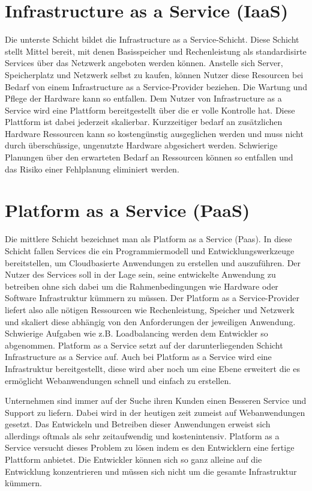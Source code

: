 \section{Infrastructure as a Service (IaaS)}
\label{sec:iaas}
Die unterste Schicht bildet die Infrastructure as a Service-Schicht.
\glqq Diese Schicht stellt Mittel bereit, mit denen Basisspeicher und Rechenleistung als standardisirte Services über das Netzwerk angeboten werden können.\grqq \cite[S. 30]{meinel_virtualisierung_2011}
Anstelle sich Server, Speicherplatz und Netzwerk selbst zu kaufen, können Nutzer diese Resourcen
bei Bedarf von einem Infrastructure as a Service-Provider beziehen. Die Wartung und Pflege der Hardware kann so entfallen.
Dem Nutzer von Infrastructure as a Service wird eine Plattform bereitgestellt über die er volle Kontrolle hat. Diese Plattform ist dabei jederzeit skalierbar. Kurzzeitiger bedarf an zusätzlichen Hardware Ressourcen kann so kostengünstig ausgeglichen werden und muss nicht durch überschüssige, ungenutzte Hardware abgesichert werden.
Schwierige Planungen über den erwarteten Bedarf an Ressourcen können so entfallen und das Risiko einer Fehlplanung eliminiert werden.

\section{Platform as a Service (PaaS)}
\label{sec:paas}
Die mittlere Schicht bezeichnet man als Platform as a Service (Paas). In diese Schicht fallen Services die ein \glqq Programmiermodell und Entwicklungswerkzeuge bereitstellen, um Cloudbasierte Anwendungen zu erstellen und auszuführen.\grqq \cite{sommergut_faq_2014}
Der Nutzer des Services soll in der Lage sein, seine entwickelte Anwendung zu betreiben ohne sich dabei um die Rahmenbedingungen wie Hardware oder Software Infrastruktur kümmern zu müssen.
Der Platform as a Service-Provider liefert also alle nötigen Ressourcen wie Rechenleistung, Speicher und Netzwerk und skaliert diese abhängig von den Anforderungen der jeweiligen Anwendung.
Schwierige Aufgaben wie z.B. Loadbalancing werden dem Entwickler so abgenommen.
Platform as a Service setzt auf der darunterliegenden Schicht Infrastructure as a Service auf.
Auch bei Platform as a Service wird eine Infrastruktur bereitgestellt, diese wird aber noch um eine Ebene erweitert die es ermöglicht Webanwendungen schnell und einfach zu erstellen.

Unternehmen sind immer auf der Suche ihren Kunden einen Besseren Service und Support zu liefern.
Dabei wird in der heutigen zeit zumeist auf Webanwendungen gesetzt. Das Entwickeln und Betreiben dieser Anwendungen erweist sich allerdings oftmals als sehr zeitaufwendig und kostenintensiv.
Platform as a Service versucht dieses Problem zu lösen indem es den Entwicklern eine fertige Plattform anbietet. Die Entwickler können sich so ganz alleine auf die Entwicklung konzentrieren und müssen sich nicht um die gesamte Infrastruktur kümmern.

